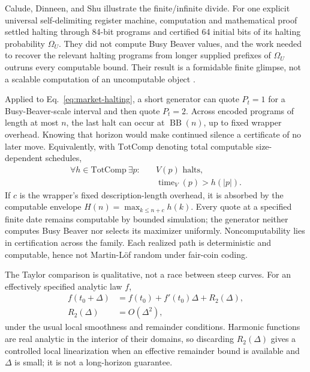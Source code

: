 \documentclass[aps,pra,reprint,superscriptaddress,amsmath,amssymb,floatfix]{revtex4-2}
\theoremstyle{plain}
\theoremstyle{definition}
\theoremstyle{remark}
\begin{document}
Calude, Dinneen, and Shu illustrate the finite/infinite divide. For one explicit
universal self-delimiting register machine, computation and mathematical proof
settled halting through 84-bit programs and certified 64 initial bits of its
halting probability \(\Omega_U\). They did not compute Busy Beaver values, and
the work needed to recover the relevant halting programs from longer supplied
prefixes of \(\Omega_U\) outruns every computable bound. Their result is a
formidable finite glimpse, not a scalable computation of an uncomputable object
\cite{2002-glimpseofran}.

Applied to Eq.~\eqref{eq:market-halting}, a short generator can quote
\(P_t=1\) for a Busy-Beaver-scale interval and then quote \(P_t=2\). Across
encoded programs of length at most \(n\), the last halt can occur at
\(\operatorname{BB}(n)\), up to fixed wrapper overhead. Knowing that horizon
would make continued silence a certificate of no later move. Equivalently,
with \(\mathrm{TotComp}\) denoting total computable size-dependent schedules,
\begin{equation}
  \begin{aligned}
  \forall h\in\mathrm{TotComp}\ \exists p:\quad
    &V(p)\text{ halts},\\
    &\operatorname{time}_V(p)>h(|p|).
  \end{aligned}
  \label{eq:bb-horizon}
\end{equation}
If \(c\) is the wrapper's fixed description-length overhead, it is absorbed by
the computable envelope \(H(n)=\max_{k\leq n+c}h(k)\). Every quote at a
specified finite date remains
computable by bounded simulation; the generator neither computes Busy Beaver
nor selects its maximizer uniformly. Noncomputability lies in certification
across the family. Each realized path is deterministic and computable, hence
not Martin-L\"of random under fair-coin coding.

The Taylor comparison is qualitative, not a race between steep curves. For an
effectively specified analytic law \(f\),
\begin{equation}
  \begin{aligned}
  f(t_0+\Delta)
    &=f(t_0)+f'(t_0)\Delta+R_2(\Delta),\\
  R_2(\Delta)&=O(\Delta^2),
  \end{aligned}
  \label{eq:taylor-local}
\end{equation}
under the usual local smoothness and remainder conditions. Harmonic functions
are real analytic in the interior of their domains, so discarding
\(R_2(\Delta)\) gives a controlled local linearization when an effective
remainder bound is available and \(\Delta\) is small; it is not a long-horizon
guarantee.
\end{document}
